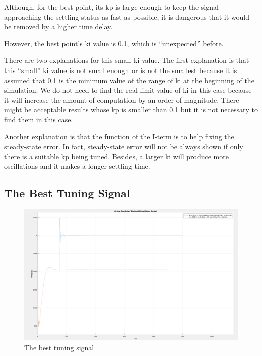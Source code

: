 Although, for the best point, its kp is large enough to keep the signal approaching the settling status as fast as possible, it is dangerous that it would be removed by a higher time delay. 

However, the best point's ki value is 0.1, which is “unexpected” before.  

There are two explanations for this small ki value. The first explanation is that this “small” ki value is not small enough or is not the smallest because it is assumed that 0.1 is the minimum value of the range of ki at the beginning of the simulation. We do not need to find the real limit value of ki in this case because it will increase the amount of computation by an order of magnitude. There might be acceptable results whose kp is smaller than 0.1 but it is not necessary to find them in this case.  

Another explanation is that the function of the I-term is to help fixing the steady-state error. In fact, steady-state error will not be always shown if only there is a suitable kp being tuned. Besides, a larger ki will produce more oscillations and it makes a longer settling time.  


\subsection{The Best Tuning Signal} %

\begin{figure}[htbp]
\centering
\includegraphics[width = .819\textwidth]{figure/4_4_2_best.png}
\caption{The best tuning signal}
\label{4_4_2_best}
\end{figure}